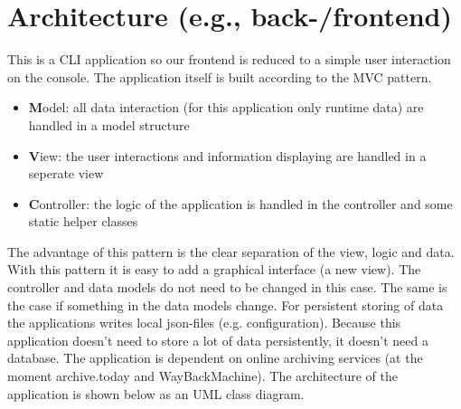 \section{Architecture (e.g., back-/frontend)}
This is a CLI application so our frontend is reduced to a simple user interaction on the console. The application itself is built according to the MVC pattern.
\begin{itemize}
    \item \textbf{M}odel: all data interaction (for this application only runtime data) are handled in a model structure
    \item \textbf{V}iew: the user interactions and information displaying are handled in a seperate view
    \item \textbf{C}ontroller: the logic of the application is handled in the controller and some static helper classes
\end{itemize}
The advantage of this pattern is the clear separation of the view, logic and data. With this pattern it is easy to add a graphical interface (a new view). The controller and data models do not need to be changed in this case. The same is the case if something in the data models change.
For persistent storing of data the applications writes local json-files (e.g. configuration). Because this application doesn't need to store a lot of data persistently, it doesn't need a database.
The application is dependent on online archiving services (at the moment archive.today and WayBackMachine). 
The architecture of the application is shown below as an UML class diagram.
